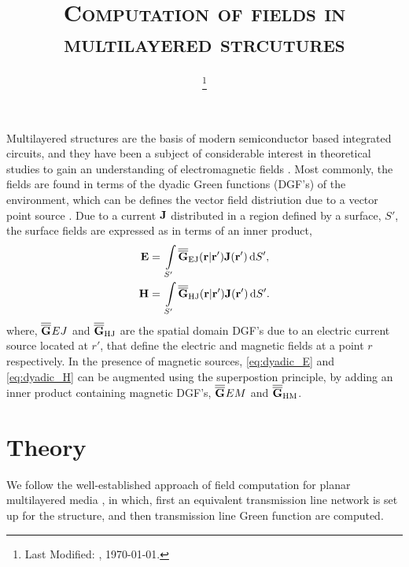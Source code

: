 \documentclass[12pt]{article}
\begin{document}
\title{\textsc{Computation of fields in multilayered strcutures}}

\date{\footnote{Last Modified: \currenttime, \today.}}

\maketitle

Multilayered structures are the basis of modern semiconductor based integrated circuits, and they have been a subject of considerable interest in theoretical studies to gain an understanding of electromagnetic fields \cite{something in here}. Most commonly, the fields are found in terms of the dyadic Green functions (DGF's) of the environment, which can be defines the vector field distriution due to a vector point source \cite{van Bladdel} \cite{}. Due to a current $\mathbf{J}$ distributed in a region defined by a surface, $S'$, the surface fields are expressed as in terms of an inner product,
%
\begin{subequations}
\begin{align}
\mathbf{E} ={}& \int\limits_{S'} \overline{\overline{\mathbf{G}}}_\mathrm{EJ}(\mathbf{r} | \mathbf{r'}) \mathbf{J}(\mathbf{r'}) \mathop{}\!\mathrm{d}{S'},
\label{eq:dyadic_E}\\
\mathbf{H} ={}& \int\limits_{S'} \overline{\overline{\mathbf{G}}}_\mathrm{HJ}(\mathbf{r} | \mathbf{r'}) \mathbf{J}(\mathbf{r'}) \mathop{}\!\mathrm{d}{S'}.
\label{eq:dyadic_H}
\end{align}
\label{eq:dyadic}%
\end{subequations}
where, $\overline{\overline{\mathbf{G}}}_\mathrm\mathrm{EJ}$ and $\overline{\overline{\mathbf{G}}}_\mathrm{HJ}$ are the spatial domain DGF's due to an electric current source located at $r'$, that define the electric and magnetic fields at a point $r$ respectively. In the presence of magnetic sources, \eqref{eq:dyadic_E} and \eqref{eq:dyadic_H} can be augmented using the superpostion principle, by adding an inner product containing magnetic DGF's, $\overline{\overline{\mathbf{G}}}_\mathrm\mathrm{EM}$ and
$\overline{\overline{\mathbf{G}}}_\mathrm{HM}$.
\section{Theory}
%
We follow the well-established approach of field computation for planar multilayered media \cite{michalski1997multilayered, michalski2005}, in which, first an equivalent transmission line network is set up for the structure, and then transmission line Green function are computed.
\end{document}
